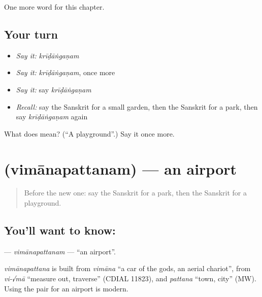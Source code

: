 \begin{grammarlens}[title={What you've built}]
One more word for this chapter.
\end{grammarlens}

\subsection*{Your turn}
\begin{itemize}
\raggedright
  \item \emph{Say it:} \emph{krīḍāṅgaṇam}
  \item \emph{Say it:} \emph{krīḍāṅgaṇam}, once more
  \item \emph{Say it:} say \emph{krīḍāṅgaṇam}
  \item \emph{Recall:} say the Sanskrit for a small garden, then the Sanskrit for a park, then say \emph{krīḍāṅgaṇam} again
\end{itemize}

\begin{tcolorbox}[breakable,colback=teal!4,colframe=teal!35!black,title={Before you move on}]
What does  mean? (\textquotedblleft{}A playground\textquotedblright{}.) Say it once more.
\end{tcolorbox}
\section[\texorpdfstring{\sk{विमानपत्तनम्} (vimānapattanam)}{विमानपत्तनम् (vimānapattanam)}]{ (vimānapattanam) — an airport}

\label{lesson:SA-C164-vimanapattanam}



\begin{quote}
Before the new one: say the Sanskrit for a park, then the Sanskrit for a playground.
\end{quote}

\subsection*{You'll want to know: }
\textbf{} — \emph{vimānapattanam} — \textquotedblleft{}an airport\textquotedblright{}.

\begin{cousinweb}
\emph{vimānapattana} is built from \emph{vimāna} \textquotedblleft{}a car of the gods, an aerial chariot\textquotedblright{}, from \emph{vi-√mā} \textquotedblleft{}measure out, traverse\textquotedblright{} (CDIAL 11823), and \emph{pattana} \textquotedblleft{}town, city\textquotedblright{} (MW). Using the pair for an airport is modern.
\end{cousinweb}

